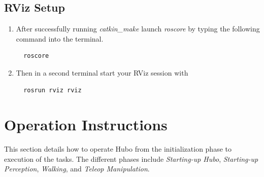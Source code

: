 \documentclass[letterpaper, 10 pt]{report}
\begin{document}
\section{RViz Setup}
\begin{enumerate}
  \item After successfully running \textit{catkin\_make} launch \textit{roscore} by typing the following command into the terminal.
  \begin{lstlisting}
  roscore
  \end{lstlisting}
  \item Then in a second terminal start your RViz session with
  \begin{lstlisting}
  rosrun rviz rviz
  \end{lstlisting}
\end{enumerate}

\pagebreak
\chapter{Operation Instructions}\label{chap:operating-instructions}
This section details how to operate Hubo from the initialization phase to execution of the tasks. The different phases include \textit{Starting-up Hubo}, \textit{Starting-up Perception}, \textit{Walking}, and \textit{Teleop Manipulation}.
\end{document}
